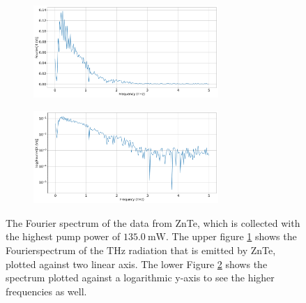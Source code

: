 \begin{figure}%
    \centering
    \begin{subfigure}{\columnwidth}%
        \centering
        \includegraphics[height=3.5cm]{Plots/2_11_30_20normalFX.pdf}%
        \label{fig:2_11_30_20_fft}%
    \end{subfigure}%
    \hfill%
    \begin{subfigure}{\columnwidth}%
        \centering
        \includegraphics[height=3.5cm]{Plots/2_11_30_20normallog(FX).pdf}%
        \label{fig:2_11_30_20_fft_log}%
    \end{subfigure}%
    \caption{The Fourier spectrum of the data from ZnTe, which is collected with the highest pump power of $\SI{135.0}{\milli\W}$.
    The upper figure \ref{fig:2_11_30_20_fft} shows the Fourierspectrum of the $\si{\tera\hertz}$ radiation that is emitted by ZnTe, plotted against two linear axis.
    The lower Figure \ref{fig:2_11_30_20_fft_log} shows the spectrum plotted against a logarithmic y-axis to see the higher frequencies as well.}%
    \label{fig:fourier_znte}%
\end{figure}%
\FloatBarrier
